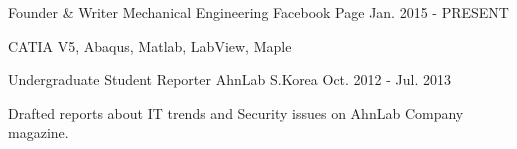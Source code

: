\begin{cventries}
  \cventry
    {Founder \& Writer}
    {Mechanical Engineering}
    {Facebook Page}
    {Jan. 2015 - PRESENT}
    {
      \begin{cvitems}
        \item CATIA V5, Abaqus, Matlab, LabView, Maple 
      \end{cvitems}
    }
  \cventry
    {Undergraduate Student Reporter}
    {AhnLab}
    {S.Korea}
    {Oct. 2012 - Jul. 2013}
    {
      \begin{cvitems}
        \item {Drafted reports about IT trends and Security issues on AhnLab Company magazine.}
      \end{cvitems}
    }
\end{cventries}
